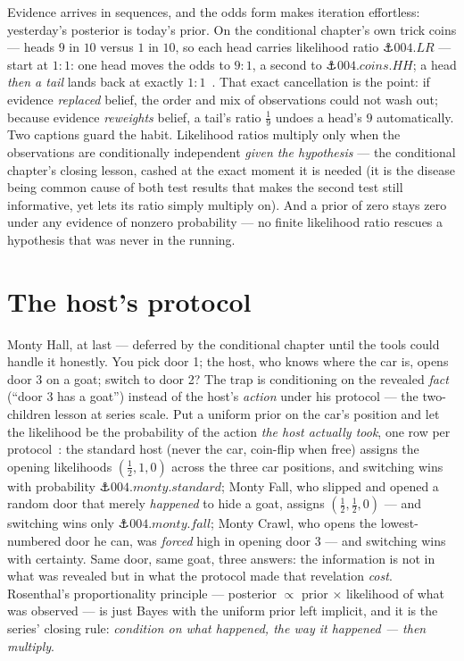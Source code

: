 \begin{narrative}
Evidence arrives in sequences, and the odds form makes iteration
effortless: yesterday's posterior is today's prior. On the conditional
chapter's own trick coins — heads $9$ in $10$ versus $1$ in $10$, so
each head carries likelihood ratio $\anchor{004.LR}$ — start at
$1{:}1$: one head moves the odds to $9{:}1$, a second to
$\anchor{004.coins.HH}$; a head \emph{then a tail} lands back at
exactly $1{:}1$~\cite{probability-mit-18-05-class-11-bayesian-updating}.
That exact cancellation is the point: if evidence \emph{replaced}
belief, the order and mix of observations could not wash out; because
evidence \emph{reweights} belief, a tail's ratio $\tfrac19$ undoes a
head's $9$ automatically. Two captions guard the habit. Likelihood
ratios multiply only when the observations are conditionally
independent \emph{given the hypothesis} — the conditional chapter's
closing lesson, cashed at the exact moment it is needed (it is the
disease being common cause of both test results that makes the second
test still informative, yet lets its ratio simply multiply on). And a
prior of zero stays zero under any evidence of nonzero probability —
no finite likelihood ratio rescues a hypothesis that was never in the
running.

\section{The host's protocol}

Monty Hall, at last — deferred by the conditional chapter until the
tools could handle it honestly. You pick door 1; the host, who knows
where the car is, opens door 3 on a goat; switch to door 2? The trap
is conditioning on the revealed \emph{fact} (``door 3 has a goat'')
instead of the host's \emph{action} under his protocol — the
two-children lesson at series scale. Put a uniform prior on the car's
position and let the likelihood be the probability of the action
\emph{the host actually took}, one row per
protocol~\cite{probability-rosenthal-monty-hall-monty-fall-monty-crawl}:
the standard host (never the car, coin-flip when free) assigns the
opening likelihoods $(\tfrac12, 1, 0)$ across the three car positions,
and switching wins with probability $\anchor{004.monty.standard}$;
Monty Fall, who slipped and opened a random door that merely
\emph{happened} to hide a goat, assigns
$(\tfrac12, \tfrac12, 0)$ — and switching wins only
$\anchor{004.monty.fall}$; Monty Crawl, who opens the lowest-numbered
door he can, was \emph{forced} high in opening door 3 — and switching
wins with certainty. Same door, same goat, three answers: the
information is not in what was revealed but in what the protocol made
that revelation \emph{cost}. Rosenthal's proportionality principle —
posterior $\propto$ prior $\times$ likelihood of what was observed —
is just Bayes with the uniform prior left implicit, and it is the
series' closing rule: \emph{condition on what happened, the way it
happened — then multiply}.


\end{narrative}

